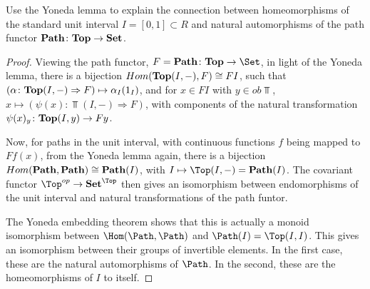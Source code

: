 \documentclass[main.tex]{subfiles}
\begin{document}
\begin{exercise}
	Use the Yoneda lemma to explain the connection between homeomorphisms of the
	standard unit interval $I = [0,1] \subset R$ and natural automorphisms of the
	path functor $\bold {Path} \colon\bold {Top} \rightarrow \bold {Set}$.
\end{exercise}

\begin{proof}
	Viewing the path functor, $F = \bold {Path}\colon\bold{Top} \rightarrow
	\Set$, in light of the Yoneda lemma, there is a bijection $Hom(
	\bold{Top} (I,-),F) \cong FI$, such that $(\alpha \colon\bold{Top} (I,-)
	\Rightarrow F) \mapsto \alpha_I (1_I)$, and for $x \in FI$ with $y \in ob
	\Top$, $x \mapsto (\psi (x) \colon\Top(I,-) \Rightarrow F)$, with
	components of the natural transformation $\psi(x)_y \colon\bold{Top} (I,y)
	\rightarrow Fy$.

	Now, for paths in the unit interval, with continuous functions $f$ being mapped
	to $Ff(x)$, from the Yoneda lemma again, there is a bijection $Hom(\bold{Path},
	\bold{Path}) \cong \bold{Path} (I)$, with $I \mapsto \Top(I,-) =
	\bold{Path} (I)$. The covariant functor $\Top^{op} \rightarrow
	\bold{Set}^{\Top}$ then gives an isomorphism between endomorphisms of the
	unit interval and natural transformations of the path funtor.

	The Yoneda embedding theorem shows that this is actually a monoid isomorphism
	between $\Hom(\Path,\Path)$ and $\Path(I)=\Top(I,I)$. This gives an isomorphism
	between their groups of invertible elements. In the first case, these are the
	natural automorphisms of $\Path$. In the second, these are the homeomorphisms of
	$I$ to itself.


\end{proof}
\end{document}
